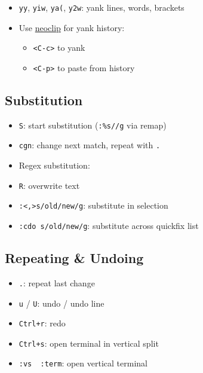 \documentclass[
  letterpaper,
  DIV=11,
  numbers=noendperiod]{scrartcl}
\newenvironment{Shaded}{}{}
\newcommand{\NormalTok}[1]{\textcolor[rgb]{0.22,0.23,0.26}{#1}}
\providecommand{\tightlist}{%
  \setlength{\itemsep}{0pt}\setlength{\parskip}{0pt}}\usepackage{longtable,booktabs,array}
\begin{document}
\begin{itemize}
\item
  \texttt{yy}, \texttt{yiw}, \texttt{ya(}, \texttt{y2w}: yank lines,
  words, brackets
\item
  Use \href{https://github.com/AckslD/nvim-neoclip.lua}{neoclip} for
  yank history:

  \begin{itemize}
  \tightlist
  \item
    \texttt{\textless{}C-c\textgreater{}} to yank
  \item
    \texttt{\textless{}C-p\textgreater{}} to paste from history
  \end{itemize}
\end{itemize}

\subsection{Substitution}\label{substitution}

\begin{itemize}
\item
  \texttt{S}: start substitution (\texttt{:\%s//g} via remap)
\item
  \texttt{cgn}: change next match, repeat with \texttt{.}
\item
  Regex substitution:

\begin{Shaded}
\end{Shaded}
\item
  \texttt{R}: overwrite text
\item
  \texttt{:\textquotesingle{}\textless{},\textquotesingle{}\textgreater{}s/old/new/g}:
  substitute in selection
\item
  \texttt{:cdo\ s/old/new/g}: substitute across quickfix list
\end{itemize}

\subsection{Repeating \& Undoing}\label{repeating-undoing}

\begin{itemize}
\tightlist
\item
  \texttt{.}: repeat last change
\item
  \texttt{u} / \texttt{U}: undo / undo line
\item
  \texttt{Ctrl+r}: redo
\item
  \texttt{Ctrl+s}: open terminal in vertical split
\item
  \texttt{:vs\ \textbar{}\ :term}: open vertical terminal
\end{itemize}
\end{document}
